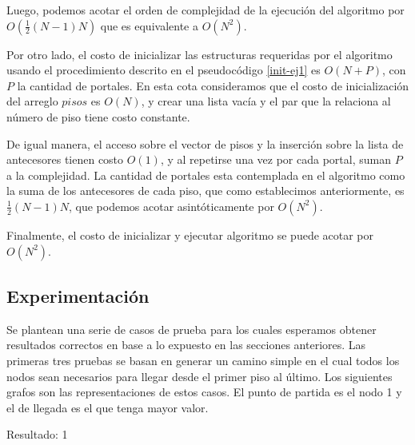 Luego, podemos acotar el orden de complejidad de la ejecución del algoritmo por $O(\frac{1}{2}(N-1)N)$ que es equivalente a $O(N^2)$.

Por otro lado, el costo de inicializar las estructuras requeridas por el algoritmo usando el procedimiento descrito en el pseudocódigo \ref{init-ej1} es $O(N+P)$, con $P$ la cantidad de portales.
En esta cota consideramos que el costo de inicialización del arreglo $pisos$ es $O(N)$, y crear una lista vacía y el par que la relaciona al número de piso tiene costo constante.

De igual manera, el acceso sobre el vector de pisos y la inserción sobre la lista de antecesores tienen costo $O(1)$, y al repetirse una vez por cada portal, suman $P$ a la complejidad. La cantidad de portales esta contemplada en el algoritmo como la suma de los antecesores de cada piso, que como establecimos anteriormente, es $\frac{1}{2}(N-1)N$, que podemos acotar asintóticamente por $O(N^2)$.

Finalmente, el costo de inicializar y ejecutar algoritmo se puede acotar por $O(N^2)$.








\subsection{Experimentación}

Se plantean una serie de casos de prueba para los cuales esperamos obtener resultados correctos en base a lo expuesto en las secciones anteriores.
Las primeras tres pruebas se basan en generar un camino simple en el cual
todos los nodos sean necesarios para llegar desde el primer piso al último. Los siguientes grafos son las representaciones de estos casos. El punto de partida es el nodo 1 y
el de llegada es el que tenga mayor valor.


Resultado: 1


